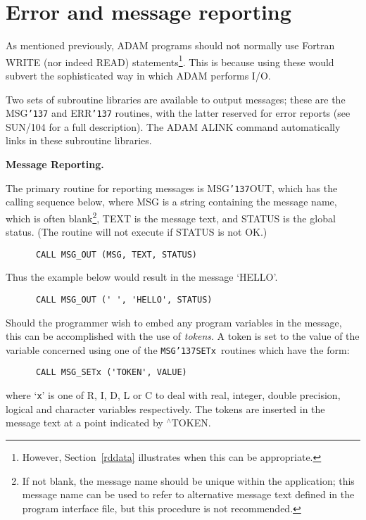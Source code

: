 \documentclass[twoside,11pt]{article}
\renewcommand{\_}{{\tt\char'137}}
\newcommand{\xref}[3]{#1}
\newcommand{\xlabel}[1]{}
\begin{document}
\section{Error and message reporting\label{repdim1}\xlabel{error_and_message_reporting}}

As mentioned previously, ADAM programs should not
normally use Fortran WRITE (nor indeed READ)
statements\footnote{However, Section~\ref{rddata} illustrates when this can be
appropriate.}.
This is because using these would subvert the sophisticated way
in which ADAM performs I/O.

Two sets of subroutine libraries are available to output
messages; these are the MSG\_  and ERR\_ routines, with the latter
reserved for error reports
(see \xref{SUN/104}{sun104}{} for a full description).
The ADAM ALINK command automatically links in these subroutine libraries.

{\bigskip\large\bf Message Reporting.}

The primary routine for reporting messages is MSG\_OUT, which has the
calling sequence below, where MSG is a string containing the message
name, which is often blank\footnote{If not blank, the message name should
be unique within the application;
this message name can be used to refer to alternative message text defined
in the program interface file, but this procedure is
not recommended.},
TEXT is the message text, and STATUS is the global status.
(The routine will not execute if STATUS is not OK.)
\begin{verbatim}
      CALL MSG_OUT (MSG, TEXT, STATUS)
\end{verbatim}
Thus the example below would result in the message `HELLO'.
\begin{verbatim}
      CALL MSG_OUT (' ', 'HELLO', STATUS)
\end{verbatim}
Should the programmer wish to embed any program variables in
the message, this can be accomplished with the use of  {\sl tokens}.
A token is set to the value of the variable concerned
using one of the {\tt MSG\_SETx}\  routines which have the form:
\begin{verbatim}
      CALL MSG_SETx ('TOKEN', VALUE)
\end{verbatim}
where `{\tt x}' is one of R, I, D, L or
C to deal with real, integer, double precision, logical and
character variables respectively.
The tokens are inserted in the message text
at a point indicated by $^\wedge$TOKEN.
\end{document}
